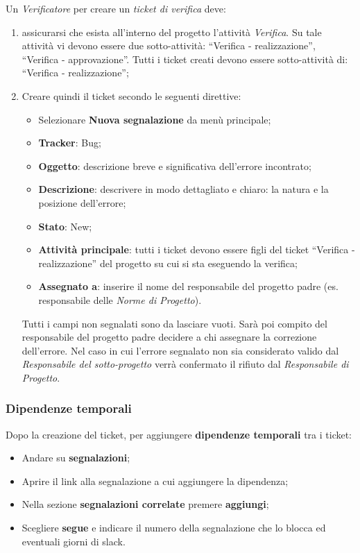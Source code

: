 Un \emph{Verificatore} per creare un \emph{ticket di verifica} deve: 
\begin{enumerate}
\item assicurarsi che esista all’interno del progetto l’attivit\`{a} \emph{Verifica}.
Su tale attivit\`{a} vi devono essere due sotto-attivit\`{a}: “Verifica - realizzazione”, 
“Verifica - approvazione”. 
Tutti i ticket creati devono essere sotto-attivit\`{a} di: “Verifica - realizzazione”; 
\item Creare quindi il ticket secondo le seguenti direttive: 
		\begin{itemize}
		
		
		\item Selezionare \textbf{Nuova segnalazione} da men\`{u} principale; 
		\item \textbf{Tracker}: Bug; 
		\item \textbf{Oggetto}: descrizione breve e significativa dell’errore incontrato; 
		\item \textbf{Descrizione}: descrivere in modo dettagliato e chiaro: la natura e la posizione dell’errore; 
		\item \textbf{Stato}: New; 
		\item \textbf{Attivit\`{a} principale}: tutti i ticket devono essere figli del ticket “Verifica - realizzazione” del progetto su cui si sta eseguendo la verifica; 
		\item \textbf{Assegnato a}: inserire il nome del responsabile del progetto padre (es. 
		responsabile delle \emph{Norme di Progetto}). 
		\end{itemize}
Tutti i campi non segnalati sono da lasciare vuoti. 
Sar\`{a} poi compito del responsabile del progetto padre decidere a chi assegnare la correzione dell’errore. Nel caso in cui l’errore segnalato non sia considerato valido dal 
\emph{Responsabile del sotto-progetto} verr\`{a} confermato il rifiuto dal \emph{Responsabile di Progetto}. 

\end{enumerate}


\subsubsection{Dipendenze temporali}


Dopo la creazione del ticket, per aggiungere \textbf{dipendenze temporali} tra i ticket:
\begin{itemize}
\item Andare su \textbf{segnalazioni}; 
\item Aprire il link alla segnalazione a cui aggiungere la dipendenza; 
\item Nella sezione \textbf{segnalazioni correlate} premere \textbf{aggiungi}; 
\item Scegliere \textbf{segue} e indicare il numero della segnalazione che lo blocca ed eventuali giorni di slack. 

\end{itemize} 

